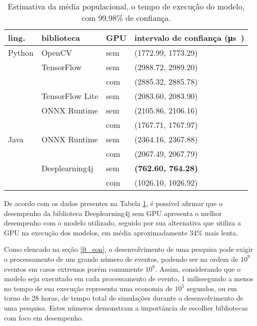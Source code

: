 \begin{table}
    \centering
    \begin{tabular}{llll}
        \toprule
        ling.  & biblioteca      & GPU & intervalo de confiança (\si\micro s) \\
        \midrule
        Python & OpenCV          & sem & (1772.99, 1773.29)                   \\
               & TensorFlow      & sem & (2988.72, 2989.20)                   \\
               &                 & com & (2885.32, 2885.78)                   \\
               & TensorFlow Lite & sem & (2083.60, 2083.90)                   \\
               & ONNX Runtime    & sem & (2105.86, 2106.16)                   \\
               &                 & com & (1767.71, 1767.97)                   \\
        Java   & ONNX Runtime    & sem & (2364.16, 2367.88)                   \\
               &                 & com & (2067.49, 2067.79)                   \\
               & Deeplearning4j  & sem & \textbf{(762.60, 764.28)}            \\
               &                 & com & (1026.10, 1026.92)                   \\

        \bottomrule
    \end{tabular}
    \caption{Estimativa da média populacional, o tempo de execução do modelo, com 99.98\% de confiança.}
    \label{tab:ci}
\end{table}

De acordo com os dados presentes na Tabela \ref{tab:ci}, é possível afirmar que o desempenho da biblioteca Deeplearning4j sem GPU apresenta o melhor desempenho com o modelo utilizado, seguido por sua alternativa que utiliza a GPU na execução dos modelos, em média aproximadamente 34\% mais lenta.

Como elencado na seção \ref{ft_eon}, o desenvolvimento de uma pesquisa pode exigir o processamento de um grande número de eventos, podendo ser na ordem de $10^9$ eventos em casos extremos porém comumente $10^8$. Assim, considerando que o modelo seja executado em cada processamento de evento, 1 milissegundo a menos no tempo de sua execução representa uma economia de $10^5$ segundos, ou em torno de 28 horas, de tempo total de simulações durante o desenvolvimento de uma pesquisa. Estes números demonstram a importância de escolher bibliotecas com foco em desempenho.

